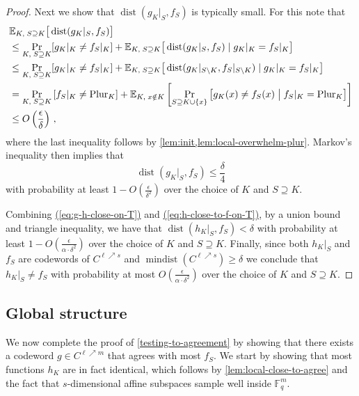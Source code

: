 \documentclass{toc}
\renewcommand{\eqref}[1]{\hyperref[#1]{(\ref*{#1})}}
\theoremstyle{plain}
\DeclareMathOperator{\dist}{dist} %
\DeclareMathOperator{\mindist}{mindist}  %
\newcommand{\E}{{\mathbb{E}}}
\newcommand{\F}{{\mathbb{F}}}
\newcommand{\pl}{{\rm{Plur}}}
\begin{document}
\begin{proof}
Next we show that $\dist(g_K|_S, f_S)$ is  typically small.
For this note that
\begin{align}\label{eq:h-close-to-f-on-T}
\nonumber &  \E_{K,\;S \supseteq K}\big[\dist(g_{K}|_S,f_{S})\big] \\
 \nonumber  & \leq \Pr_{K,\;S \supseteq K}[ g_K|_K \neq f_S|_K]+   \E_{K,\;S \supseteq K}\big[\dist(g_{K}|_S,f_{S}) \mid g_K|_K = f_S|_K\big] \\
  \nonumber  & \leq \Pr_{K,\;S \supseteq K}[ g_K|_K \neq f_S|_K]+   \E_{K,\;S \supseteq K}\big[\dist(g_{K}|_{S\setminus K},f_{S}|_{S\setminus K}) \mid g_K|_K = f_S|_K\big] \\
  \nonumber & =  \Pr_{K,\;S \supseteq K} \left[f_S|_K \neq \pl_K \right]+\mathbb{E}_{K,\; x \notin K} \left[\Pr_{S \supseteq K \cup \{x\}} \big[g_K(x) \neq f_S(x) \bigm| f_S|_K = \pl_K \big] \right]  \\
& \leq   O\left( \frac{\epsilon} { \delta}\right)\,,
\end{align}
where the last inequality follows by  \cref{lem:init,lem:local-overwhelm-plur}. Markov's inequality then implies that 
\begin{equation}\label{eq:g-close-to-f-on-T}
 \dist(g_{K}|_S,f_S) \leq \frac{\delta} {4} 
 \end{equation}
 with probability at least $1- O\left(\frac{\epsilon} {\delta^2}\right)$ over the choice of  $K$ and $S \supseteq K$. 
 

Combining \eqref{eq:g-h-close-on-T} and \eqref{eq:h-close-to-f-on-T}, by a union bound and triangle inequality, we have that
 $\dist(h_{K}|_S,f_S) < \delta$ with probability at least $1- O\left(\frac{\epsilon} {\alpha \cdot \delta^2}\right)$ over the choice of  $K$ and $S \supseteq K$. 
Finally, since both $h_K|_{S}$ and $f_{S}$ are codewords of $C^{\ell \nearrow s}$ and $\mindist(C^{\ell \nearrow s}) \geq \delta$ we conclude that  $h_K|_{S} \neq f_{S}$ with probability at most $O\left(\frac{\epsilon} {\alpha \cdot \delta^2}\right)$  over the choice of $K$ and $S \supseteq K$.
\end{proof}


\subsection{Global structure}\label{subsec:global-struct}

We now complete the proof of \cref{testing-to-agreement} by showing that there exists a codeword $g \in C^{\ell \nearrow m}$ that agrees with most $f_S$. We start by showing that most functions $h_K$ are in fact identical, which follows by
\cref{lem:local-close-to-agree} and the fact that $s$-dimensional affine subspaces sample well inside $\F_q^m$.
\end{document}
